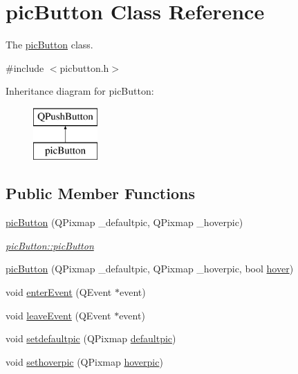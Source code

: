 \hypertarget{classpic_button}{}\section{pic\+Button Class Reference}
\label{classpic_button}


The \hyperlink{classpic_button}{pic\+Button} class.  




{\ttfamily \#include $<$picbutton.\+h$>$}

Inheritance diagram for pic\+Button\+:\begin{figure}[H]
\begin{center}
\leavevmode
\includegraphics[height=2.000000cm]{classpic_button}
\end{center}
\end{figure}
\subsection*{Public Member Functions}
\begin{DoxyCompactItemize}
\item 
\hyperlink{classpic_button_a1d5dc5f3e6a73e24dd873fb6a33a3e7f}{pic\+Button} (Q\+Pixmap \+\_\+defaultpic, Q\+Pixmap \+\_\+hoverpic)
\begin{DoxyCompactList}\small\item\em \hyperlink{classpic_button_a1d5dc5f3e6a73e24dd873fb6a33a3e7f}{pic\+Button\+::pic\+Button} \end{DoxyCompactList}\item 
\hyperlink{classpic_button_a6c7eca4ea10251d19dde58edea0f0e12}{pic\+Button} (Q\+Pixmap \+\_\+defaultpic, Q\+Pixmap \+\_\+hoverpic, bool \hyperlink{classpic_button_ab011ab567cb14054023cc46cfc3110c1}{hover})
\item 
void \hyperlink{classpic_button_a8e06509469d6b2c5efe9c58558209350}{enter\+Event} (Q\+Event $\ast$event)
\item 
void \hyperlink{classpic_button_a22c110a8f610d4a315b2c260e7d1f2b9}{leave\+Event} (Q\+Event $\ast$event)
\item 
void \hyperlink{classpic_button_a38c0a41c10500e605cda766094ee00a5}{setdefaultpic} (Q\+Pixmap \hyperlink{classpic_button_a13f03c5d3c47b0a10b3798f9588a8cf5}{defaultpic})
\item 
void \hyperlink{classpic_button_a632d61dedf5693fcade81c6a998a377d}{sethoverpic} (Q\+Pixmap \hyperlink{classpic_button_a6e387b9fc6348b681a786db8452fbc9d}{hoverpic})
\end{DoxyCompactItemize}
